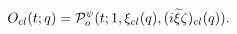 \begin{equation}
O_{cl}(t;q)= {\cal P}^{\psi}_o(t;1,\xi_{cl}(q),(i{\widetilde 
\xi}\zeta)_{cl}(q)).
\end{equation}

